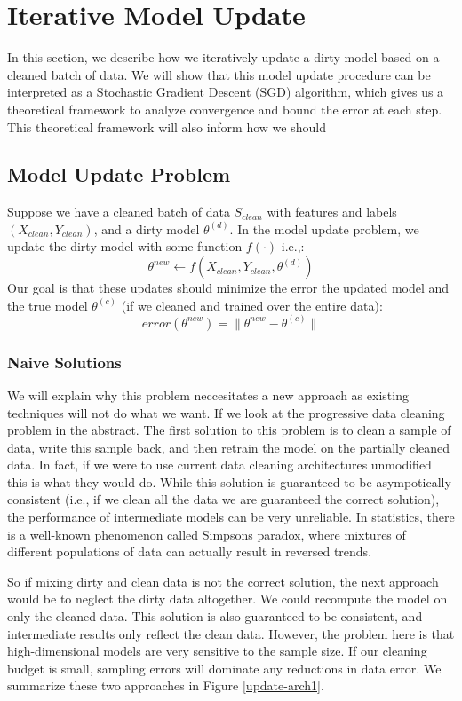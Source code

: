 \section{Iterative Model Update}
In this section, we describe how we iteratively update a dirty model based on
a cleaned batch of data.
We will show that this model update procedure can be interpreted as a Stochastic 
Gradient Descent (SGD) algorithm, which gives us a theoretical framework to analyze
convergence and bound the error at each step.
This theoretical framework will also inform how we should 

\subsection{Model Update Problem}
Suppose we have a cleaned batch of data $S_{clean}$ with features and labels $(X_{clean},Y_{clean})$, and a dirty model $\theta^{(d)}$. 
In the model update problem, we update the dirty model with some function $f(\cdot)$ i.e.,:
\[
\theta^{new} \leftarrow f(X_{clean},Y_{clean},\theta^{(d)})
\]
Our goal is that these updates should minimize the error the updated model and the true model $\theta^{(c)}$ (if we cleaned and trained over the entire data):
\[
error(\theta^{new}) = \| \theta^{new} - \theta^{(c)} \|
\]

\subsubsection{Naive Solutions}
We will explain why this problem neccesitates a new approach as existing techniques will not do what we want.
If we look at the progressive data cleaning problem in the abstract.
The first solution to this problem is to clean a sample of data, write this sample back, and then retrain the model on the partially cleaned data.
In fact, if we were to use current data cleaning architectures unmodified this is what they would do.
While this solution is guaranteed to be asympotically consistent (i.e., if we clean all the data we are guaranteed the correct solution), the performance of intermediate models can be very unreliable.
In statistics, there is a well-known phenomenon called Simpsons paradox, where mixtures of different populations of data can actually result in reversed trends.

So if mixing dirty and clean data is not the correct solution, the next approach would be to neglect the dirty data altogether.
We could recompute the model on only the cleaned data.
This solution is also guaranteed to be consistent, and intermediate results only reflect the clean data.
However, the problem here is that high-dimensional models are very sensitive to the sample size.
If our cleaning budget is small, sampling errors will dominate any reductions in data error.
We summarize these two approaches in Figure \ref{update-arch1}.

